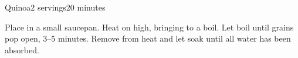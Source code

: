 \documentclass[../Cookbook.tex]{subfiles}
\begin{document}
\begin{recipe}{Quinoa}{2 servings}{20 minutes}

Place in a small saucepan. Heat on high, bringing to a boil. Let boil until grains pop open, 3--5 minutes. Remove from heat and let soak until all water has been absorbed.

\end{recipe}
\end{document}
